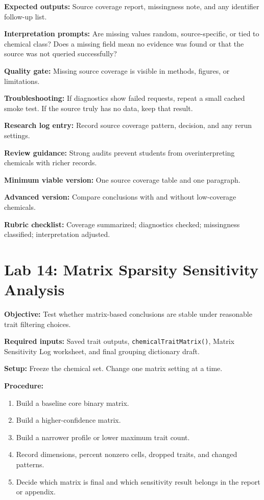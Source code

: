 \textbf{Expected outputs:} Source coverage report, missingness note, and any identifier follow-up list.

\textbf{Interpretation prompts:} Are missing values random, source-specific, or tied to chemical class? Does a missing field mean no evidence was found or that the source was not queried successfully?

\textbf{Quality gate:} Missing source coverage is visible in methods, figures, or limitations.

\textbf{Troubleshooting:} If diagnostics show failed requests, repeat a small cached smoke test. If the source truly has no data, keep that result.

\textbf{Research log entry:} Record source coverage pattern, decision, and any rerun settings.

\textbf{Review guidance:} Strong audits prevent students from overinterpreting chemicals with richer records.

\textbf{Minimum viable version:} One source coverage table and one paragraph.

\textbf{Advanced version:} Compare conclusions with and without low-coverage chemicals.

\textbf{Rubric checklist:} Coverage summarized; diagnostics checked; missingness classified; interpretation adjusted.

\section{Lab 14: Matrix Sparsity Sensitivity Analysis}
\textbf{Objective:} Test whether matrix-based conclusions are stable under reasonable trait filtering choices.

\textbf{Required inputs:} Saved trait outputs, \texttt{chemicalTraitMatrix()}, Matrix Sensitivity Log worksheet, and final grouping dictionary draft.

\textbf{Setup:} Freeze the chemical set. Change one matrix setting at a time.

\textbf{Procedure:}
\begin{enumerate}
  \item Build a baseline core binary matrix.
  \item Build a higher-confidence matrix.
  \item Build a narrower profile or lower maximum trait count.
  \item Record dimensions, percent nonzero cells, dropped traits, and changed patterns.
  \item Decide which matrix is final and which sensitivity result belongs in the report or appendix.
\end{enumerate}

